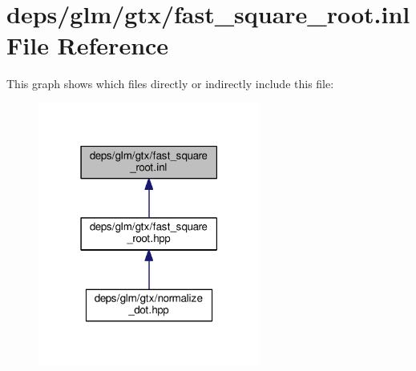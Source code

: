 \hypertarget{fast__square__root_8inl}{}\section{deps/glm/gtx/fast\+\_\+square\+\_\+root.inl File Reference}
\label{fast__square__root_8inl}
This graph shows which files directly or indirectly include this file\+:
\nopagebreak
\begin{figure}[H]
\begin{center}
\leavevmode
\includegraphics[width=207pt]{d7/dca/fast__square__root_8inl__dep__incl}
\end{center}
\end{figure}
